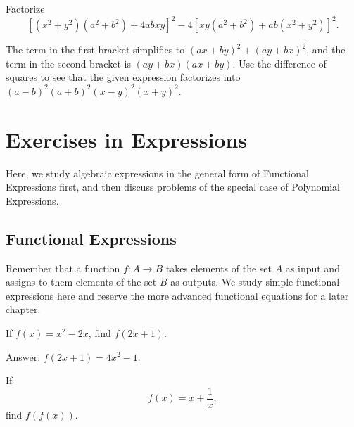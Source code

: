 \documentclass[12pt,a4paper]{memoir}
\theoremstyle{definition}
\begin{document}

\begin{question}
	Factorize \[[(x^2+y^2)(a^2+b^2)+4abxy]^2 - 4[xy(a^2+b^2)+ab(x^2+y^2)]^2.\]
\end{question}

\begin{solution}[name=Solution by Parviz Shahriari]
	The term in the first bracket simplifies to $(ax+by)^2+(ay+bx)^2$, and the term in the second bracket is $(ay+bx)(ax+by)$. Use the difference of squares to see that the given expression factorizes into $(a-b)^2(a+b)^2(x-y)^2(x+y)^2$. 
\end{solution}




\newpage
% 

\section{Exercises in Expressions}
Here, we study algebraic expressions in the general form of Functional Expressions first, and then discuss problems of the special case of Polynomial Expressions.

\subsection{Functional Expressions}
Remember that a function $f:A\to B$ takes elements of the set $A$ as input and assigns to them elements of the set $B$ as outputs. We study simple functional expressions here and reserve the more advanced functional equations for a later chapter.

\begin{tcolorbox}
	\begin{question}
		If $f(x)=x^2-2x$, find $f(2x+1)$.
	\end{question}
\end{tcolorbox}

\begin{solution}[name=Solution by Parviz Shahriari]
	Answer: $f(2x+1)=4x^2-1$.
\end{solution}

\begin{tcolorbox}
	\begin{question}
		If \[f(x)=x+\frac{1}{x},\] find $f(f(x))$.
	\end{question}
\end{tcolorbox}
\end{document}
